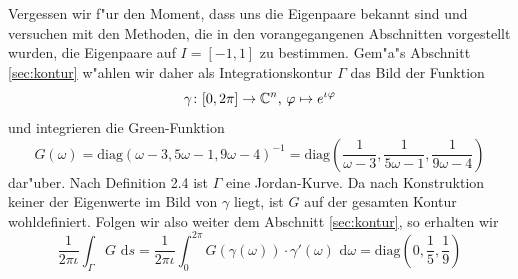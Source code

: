 Vergessen wir f"ur den Moment, dass uns die Eigenpaare bekannt sind und versuchen
mit den Methoden, die in den vorangegangenen Abschnitten vorgestellt wurden, die Eigenpaare auf $I = [-1,1]$ zu bestimmen.
Gem"a"s Abschnitt \ref{sec:kontur} w"ahlen wir daher als Integrationskontur $\Gamma$ das Bild der Funktion
\begin{equation}\label{kurve}
\gamma\colon [0,2\pi]\to\mathbb{C}^n\text{, }\varphi\mapsto e^{\iota \varphi}
\end{equation}
und integrieren die Green-Funktion
\[
G(\omega) = \text{diag}(\omega-3, 5\omega-1, 9\omega-4)^{-1}
=\text{diag}\left(\frac{1}{\omega-3}, \frac{1}{5\omega-1}, \frac{1}{9\omega-4}\right)
\]
dar"uber.
Nach Definition 2.4 ist $\Gamma$ eine Jordan-Kurve.
Da nach Konstruktion keiner der Eigenwerte im Bild von
$\gamma$ liegt, ist $G$ auf der gesamten Kontur wohldefiniert.
Folgen wir also weiter dem Abschnitt \ref{sec:kontur}, so erhalten wir
\[
\frac{1}{2\pi\iota} \int_\Gamma G \text{ d}s =
\frac{1}{2\pi\iota}\int_0^{2\pi} G(\gamma(\omega))\cdot \gamma'(\omega)
\text{ d}\omega
= \text{diag}\left( 0, \frac{1}{5}, \frac{1}{9} \right)
\]

